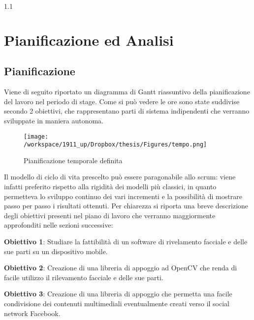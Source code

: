 
1.1\chapter{Pianificazione ed Analisi} %

\label{Capitolo 3} %



\section{Pianificazione}

Viene di seguito riportato un diagramma di Gantt riassuntivo della pianificazione
del lavoro nel periodo di stage. Come si può vedere le ore sono state suddivise secondo
2 obiettivi, che rappresentano parti di sistema indipendenti che verranno sviluppate
in maniera autonoma.\\

\begin{figure}[h]\centering  
\texttt{[image: /workspace/1911\_up/Dropbox/thesis/Figures/tempo.png]}
\caption[Pianificazione temporale]{Pianificazione temporale definita}
\label{pic-a}
\end{figure}

Il modello di ciclo di vita prescelto può essere paragonabile allo scrum: viene infatti preferito rispetto alla rigidità dei modelli più classici, in
quanto permetteva lo sviluppo continuo dei vari incrementi e la possibilità di mostrare
passo per passo i risultati ottenuti. Per chiarezza si riporta una breve descrizione degli
obiettivi presenti nel piano di lavoro che verranno maggiormente approfonditi nelle
sezioni successive:

\textbf{Obiettivo 1}: Studiare la fattibilità di un software di rivelamento facciale e delle sue parti su un dispositivo mobile.

\textbf{Obiettivo 2}: Creazione di una libreria di appoggio ad OpenCV che renda di facile utilizzo il rilevamento facciale e delle sue parti.

\textbf{Obiettivo 3}: Creazione di una libreria di appoggio che permetta una facile condivisione dei contenuti multimediali eventualmente creati verso il social network Facebook.


